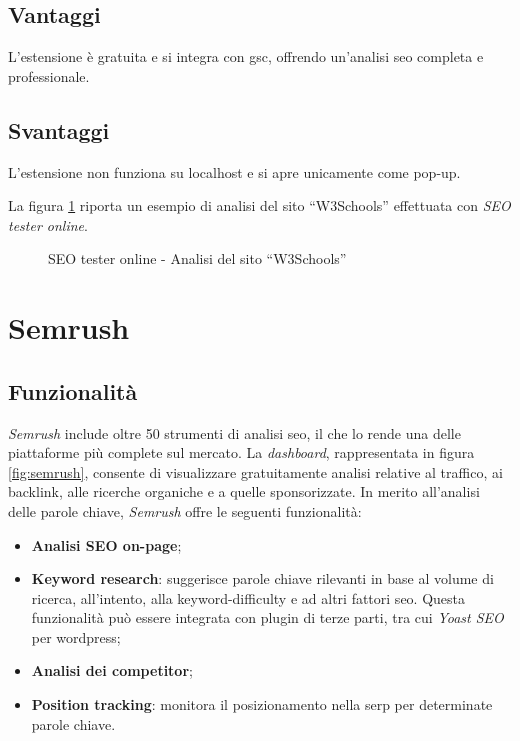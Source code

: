 \subsection{Vantaggi}
\par L'estensione è gratuita e si integra con \gls{gsc}, offrendo un'analisi \gls{seo} completa e professionale.

\subsection{Svantaggi}
\par L'estensione non funziona su \gls{localhost} e si apre unicamente come pop-up.

\vspace{15pt}
\par\noindent La figura \ref{fig:seo_tester_online_w3schools} riporta un esempio di analisi del sito “W3Schools” effettuata con \textit{SEO tester online}.

\begin{figure}[H]
    \centering 
    \caption{SEO tester online - Analisi del sito “W3Schools”}
    \label{fig:seo_tester_online_w3schools}
\end{figure}

\section{Semrush}

\subsection{Funzionalità}
\par \textit{Semrush} include oltre 50 strumenti di analisi \gls{seo}, il che lo rende una delle piattaforme più complete sul mercato. La \textit{dashboard}, rappresentata in figura \ref{fig:semrush}, consente di visualizzare gratuitamente analisi relative al traffico, ai \gls{backlink}, alle ricerche \gls{organiche} e a quelle \gls{sponsorizzate}. In merito all’analisi delle parole chiave, \textit{Semrush} offre le seguenti funzionalità:
\begin{itemize}
    \item \textbf{Analisi SEO on-page};
    \item \textbf{Keyword research}: suggerisce parole chiave rilevanti in base al volume di ricerca, all'intento, alla \gls{keyword-difficulty} e ad altri fattori \gls{seo}. Questa funzionalità può essere integrata con plugin di terze parti, tra cui \textit{Yoast SEO} per \gls{wordpress};
    \item \textbf{Analisi dei competitor};
    \item \textbf{Position tracking}: monitora il posizionamento nella \gls{serp} per determinate parole chiave.
\end{itemize}

